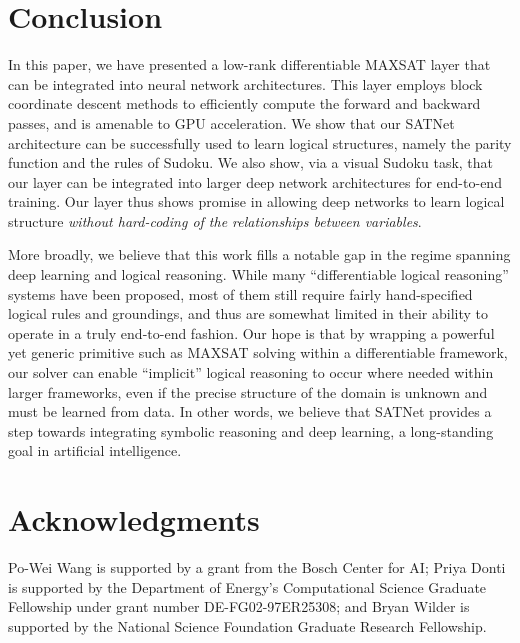 \documentclass{article}
\begin{document}
	\section{Conclusion}
	In this paper, we have presented a low-rank differentiable MAXSAT layer that can be integrated into neural network architectures.
	This layer employs block coordinate descent methods to efficiently compute the forward and backward passes, and is amenable to GPU acceleration.
	We show that our SATNet architecture can be successfully used to learn logical structures, namely the parity function and the rules of  Sudoku.
	We also show, via a visual Sudoku task, that our layer can be integrated into larger deep network architectures for end-to-end training.
	Our layer thus shows promise in allowing deep networks to learn logical structure \emph{without hard-coding of the relationships between variables}.
	
	More broadly, we believe that this work fills a notable gap in the regime spanning deep learning and logical reasoning.  
	While many ``differentiable logical reasoning'' systems have been proposed, most of them still require 
	fairly hand-specified logical rules and groundings, 
	and thus are somewhat limited in their ability to operate in a truly end-to-end fashion.  
Our hope is that by wrapping a powerful yet generic primitive such as MAXSAT solving within a differentiable framework, 
	our solver can enable ``implicit'' logical reasoning to occur where needed within larger frameworks, even if the precise structure of the domain is unknown and must be learned from data.  
	In other words, we believe that SATNet provides a step towards integrating symbolic reasoning and deep learning, a long-standing goal in artificial intelligence. 

	\section*{Acknowledgments}
	Po-Wei Wang is supported by a grant from the Bosch Center for AI; Priya Donti is supported by the Department of Energy's Computational Science Graduate Fellowship under grant number DE-FG02-97ER25308; and Bryan Wilder is supported by the National Science Foundation Graduate Research Fellowship.
	
	
	
	
	\clearpage
	\newpage
	\appendix
	
\end{document}
